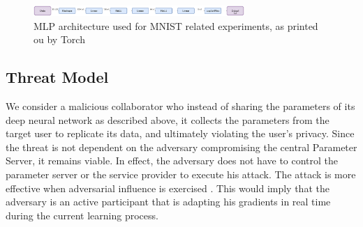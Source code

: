 \documentclass[conference]{IEEEtran}
\begin{document}
\begin{figure}[!h]
\includegraphics[width=8cm, keepaspectratio]{MLPArchitecture}
\caption{MLP architecture used for MNIST related experiments, as printed ou by Torch}
\label{fig:MLPArch}

\end{figure}

\subsection{Threat Model}

We consider a malicious collaborator who instead of sharing the parameters of its deep neural
network as described above, it collects the parameters from the target user to replicate its data, and ultimately violating the user's
privacy.  
Since the threat is not{} dependent on the adversary compromising the
central Parameter Server, it remains viable. In effect, the adversary does not have to control the parameter server or the service
provider to execute his attack. The attack is more effective when adversarial influence is exercised \cite{hitaj2017deep}. This would
imply that
the adversary is an active participant that is adapting his gradients in real time during the current learning process.




\end{document}
